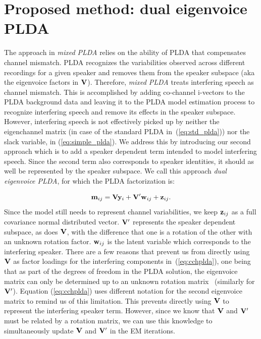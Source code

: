 \section{Proposed method: dual eigenvoice PLDA}
\label{sec:dualev_plda}

The approach in {\it mixed PLDA} relies on the ability of PLDA that compensates channel mismatch. 
PLDA recognizes the variabilities observed across different recordings for a given speaker and removes them from the speaker subspace (aka the eigenvoice factors in ${\bf V}$). 
Therefore, {\it mixed PLDA} treats interfering speech as channel mismatch. 
This is accomplished by adding co-channel i-vectors to the PLDA background data and leaving it to the PLDA model estimation process to recognize interfering speech and remove its effects in the speaker subspace. 
However, interfering speech is not effectively picked up by neither the eigenchannel matrix (in case of the standard PLDA in~(\ref{eq:std_plda})) nor the slack variable, in (\ref{eq:simple_plda}). 
We address this by introducing our second approach which is to add a speaker dependent term intended to model interfering speech. Since the second term also corresponds to speaker identities, it should as well be represented by the speaker subspace. 
We call this approach {\it dual eigenvoice PLDA}, for which the PLDA factorization is: 

\begin{equation}
\label{eq:cchplda}
{\bf m}_{ij} = {\bf V}{\bf y}_i+{\bf V}^\prime {\bf w}_{ij}+{\bf z}_{ij}.
\end{equation}
Since the model still needs to represent channel variabilities, we keep ${\bf z}_{ij}$ as a full covariance normal distributed vector. 
${\bf V}^\prime$ represents the speaker dependent subspace, as does ${\bf V}$, with the difference that one is a rotation of the other with an unknown rotation factor. 
${\bf w}_{ij}$ is the latent variable which corresponds to the interfering speaker. 
There are a few reasons that prevent us from directly using ${\bf V}$ as factor loadings for the interfering components in~(\ref{eq:cchplda}), one being that as part of the degrees of freedom in the PLDA solution, the eigenvoice matrix can only be determined up to an unknown rotation matrix~\cite{sizov2014unifying} (similarly for ${\bf V}^\prime$). 
Equation (\ref{eq:cchplda}) uses different notation for the second eigenvoice matrix to remind us of this limitation. 
This prevents directly using ${\bf V}$ to represent the interfering speaker term. However, since we know that ${\bf V}$ and ${\bf V}^\prime$ must be related by a rotation matrix, we can use this knowledge to simultaneously update ${\bf V}$ and ${\bf V}^\prime$ in the EM iterations. 

